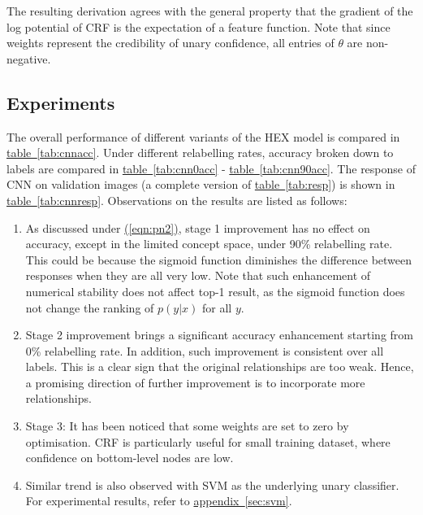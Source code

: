 \documentclass[11pt,a4paper]{article}
\begin{document}
The resulting derivation agrees with the general property that the gradient of the log potential of CRF is the expectation of a feature function. Note that since weights represent the credibility of unary confidence, all entries of $\theta$ are non-negative.

\subsection{Experiments}
\label{sec:exp2}

The overall performance of different variants of the HEX model is compared in \hyperref[tab:cnnacc]{table~\ref{tab:cnnacc}}. Under different relabelling rates, accuracy broken down to labels are compared in \hyperref[tab:cnn0acc]{table~\ref{tab:cnn0acc}} - \hyperref[tab:cnn90acc]{table~\ref{tab:cnn90acc}}. The response of CNN on validation images (a complete version of \hyperref[tab:resp]{table~\ref{tab:resp}}) is shown in \hyperref[tab:cnnresp]{table~\ref{tab:cnnresp}}. Observations on the results are listed as follows:
\begin{enumerate}
\item As discussed under \hyperref[eqn:pn2]{(\ref{eqn:pn2})}, stage 1 improvement has no effect on accuracy, except in the limited concept space, under 90\% relabelling rate. This could be because the sigmoid function diminishes the difference between responses when they are all very low. Note that such enhancement of numerical stability does not affect top-1 result, as the sigmoid function does not change the ranking of $p(y|x)$ for all $y$.
\item Stage 2 improvement brings a significant accuracy enhancement starting from 0\% relabelling rate. In addition, such improvement is consistent over all labels. This is a clear sign that the original relationships are too weak. Hence, a promising direction of further improvement is to incorporate more relationships.
\item Stage 3: It has been noticed that some weights are set to zero by optimisation. CRF is particularly useful for small training dataset, where confidence on bottom-level nodes are low.
\item Similar trend is also observed with SVM as the underlying unary classifier. For experimental results, refer to \hyperref[sec:svm]{appendix~\ref{sec:svm}}.
\end{enumerate}
\end{document}
